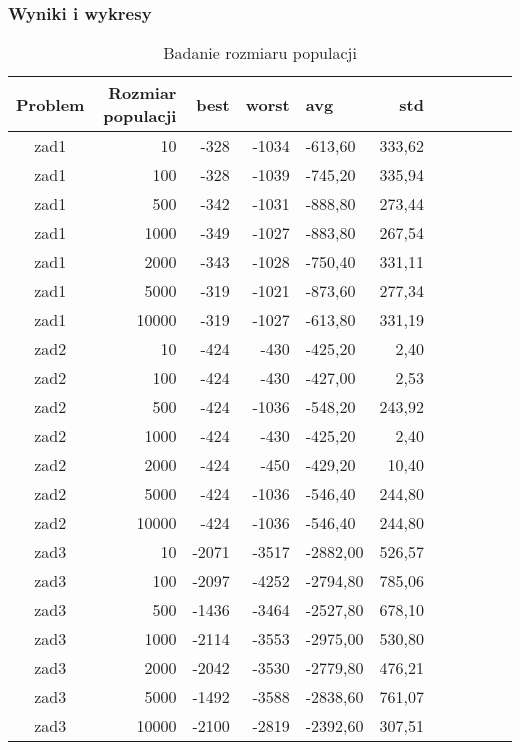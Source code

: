 \documentclass[12pt,a4paper]{article}
\begin{document}
\subsubsection{Wyniki i wykresy}
\begin{table}[htbp]
  \centering
    \begin{tabular}{crrrlrrrrrr}
    \multicolumn{1}{p{3.715em}}{\textbf{Problem}} & \multicolumn{1}{p{5.93em}}{\textbf{Rozmiar populacji}} & \multicolumn{1}{p{2.645em}}{\textbf{best}} & \multicolumn{1}{p{2.93em}}{\textbf{worst}} & \multicolumn{1}{p{3.785em}}{\textbf{avg}} & \multicolumn{1}{p{3.5em}}{\textbf{std}} \\
    \midrule
    zad1  & 10     & -328  & -1034 & -613,60 & 333,62 \\
    zad1  & 100    & -328  & -1039 & -745,20 & 335,94 \\
    zad1  & 500    & -342  & -1031 & -888,80 & 273,44 \\
    zad1  & 1000   & -349  & -1027 & -883,80 & 267,54 \\
    zad1  & 2000   & -343  & -1028 & -750,40 & 331,11 \\
    zad1  & 5000   & -319  & -1021 & -873,60 & 277,34 \\
    zad1  & 10000  & -319  & -1027 & -613,80 & 331,19 \\
    \midrule
    zad2  & 10     & -424  & -430  & -425,20 & 2,40 \\
    zad2  & 100    & -424  & -430  & -427,00 & 2,53 \\
    zad2  & 500    & -424  & -1036 & -548,20 & 243,92 \\
    zad2  & 1000   & -424  & -430  & -425,20 & 2,40 \\
    zad2  & 2000   & -424  & -450  & -429,20 & 10,40 \\
    zad2  & 5000   & -424  & -1036 & -546,40 & 244,80 \\
    zad2  & 10000  & -424  & -1036 & -546,40 & 244,80 \\
    \midrule
    zad3  & 10     & -2071 & -3517 & -2882,00 & 526,57 \\
    zad3  & 100    & -2097 & -4252 & -2794,80 & 785,06 \\
    zad3  & 500    & -1436 & -3464 & -2527,80 & 678,10 \\
    zad3  & 1000   & -2114 & -3553 & -2975,00 & 530,80 \\
    zad3  & 2000   & -2042 & -3530 & -2779,80 & 476,21 \\
    zad3  & 5000   & -1492 & -3588 & -2838,60 & 761,07 \\
    zad3  & 10000  & -2100 & -2819 & -2392,60 & 307,51 \\
    \end{tabular}%
  \caption{Badanie rozmiaru populacji}
  \label{tab:addlabel}%
\end{table}%
\end{document}
